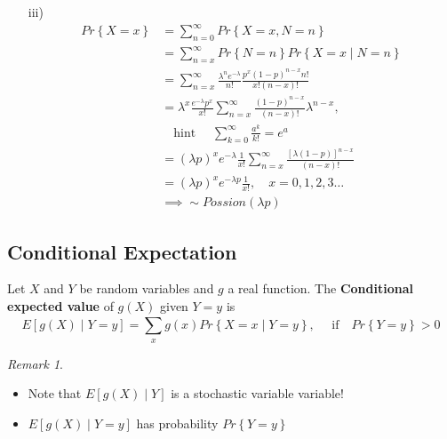 \documentclass{article}
\theoremstyle{remark}
\newtheorem*{remark}{Remark}
\begin{document}
\begin{tcolorbox}
\begin{itemize}
     \item[iii)]  \[
         \begin{split}
     Pr \left \{ X=x \right \} &=    \sum_{n=0}^{\infty}  Pr \left \{ X =x, N =n \right \}  \\
     &= \sum_{n=x}^{\infty}  Pr \left \{ N =n \right \} Pr \left \{ X=x  \mid  N =n \right \}     \\
     &=  \sum_{n = x}^{ \infty}  \frac{\lambda ^{n} e^{-\lambda }}{ n! }  \frac{p^{x} \left( 1-p \right) ^{n-x} n !}{ x! \left( n -x \right)!}  \\
     &=   \lambda ^{x}\frac{e^{- \lambda } p^{x} }{x!}   \sum_{n=x}^{\infty}  \frac{\left( 1-p \right)^{n-x}}{\left( n-x \right)!} \lambda ^{n-x}, \\
       & \quad \text{hint } \quad \sum_{k=0}^{\infty} \frac{a^{k}}{k!}  = e^{a} \\
        &=  \left( \lambda p \right)^{x} e^{-\lambda } \frac{1}{x!}  \sum_{n=x}^{\infty}  \frac{\left[ \lambda \left( 1-p \right) \right]^{n-x}}{\left( n-x \right)!}   \\
        &= \left( \lambda p \right)^{x} e^{-\lambda p} \frac{1}{x!}  , \quad x = 0,1,2,3 \ldots  \\
        &\implies  \sim Possion\left( \lambda p \right)  
         \end{split} 
     \]  
     \end{itemize}

   \end{tcolorbox}

   \subsection{Conditional Expectation}%
   \label{sub:conditional_expectation}

   Let $X$ and $Y$ be random variables and $g$ a real function. The \textbf{Conditional expected value}  of $g\left( X \right) $ given $Y =y$ is \[
   E \left[ g\left( X \right)  \mid  Y =y \right] = \sum_{x}^{}  g\left( x \right) Pr \left \{ X =x  \mid  Y =y \right \} , \quad \text{ if} \quad  Pr \left \{ Y =y \right \} > 0  
   \] 
   \begin{remark}
     \begin{itemize}
       \item
     Note that $E\left[ g\left( X \right)  \mid  Y \right]$ is a stochastic variable variable! 
   \item $E\left[ g\left( X \right)  \mid  Y =y \right]$ has probability $Pr \left \{ Y =y \right \} $
     \end{itemize}
   \end{remark}
\end{document}
